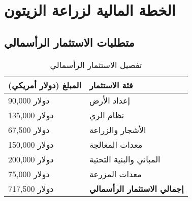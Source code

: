 \section{الخطة المالية لزراعة الزيتون}

\subsection{متطلبات الاستثمار الرأسمالي}

\begin{table}[h]
\centering
\begin{tabular}{p{}p{}}
\hline
\textbf{المبلغ (دولار أمريكي)} & \textbf{فئة الاستثمار} \\
\hline
90,000 دولار & إعداد الأرض \\
135,000 دولار & نظام الري \\
67,500 دولار & الأشجار والزراعة \\
150,000 دولار & معدات المعالجة \\
200,000 دولار & المباني والبنية التحتية \\
75,000 دولار & معدات المزرعة \\
\hline
717,500 دولار & \textbf{إجمالي الاستثمار الرأسمالي} \\
\hline
\end{tabular}
\caption{تفصيل الاستثمار الرأسمالي}
\end{table}


